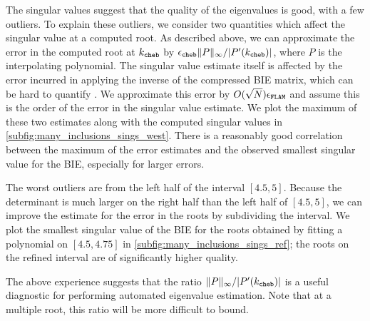 The singular values suggest that the quality of the
eigenvalues is good, with a few outliers.
%
To explain these outliers, we consider two quantities
which affect the singular value at a computed root.
%
As described above, we can approximate the
error in the computed root at $k_{\texttt{cheb}}$ by
${\epsilon_{\texttt{cheb}}} \|P\|_\infty/|P'(k_{\texttt{cheb}})|$,
where $P$ is the interpolating polynomial.
%
The singular value estimate itself is affected by
the error incurred in applying the inverse of the
compressed BIE matrix, which can be hard to quantify
\cite{ho2012fast}.
%
We approximate this error by $O(\sqrt{N}){\epsilon_{\texttt{FLAM}}}$
and assume this is the order of the error in
the singular value estimate.
We plot the maximum of these two estimates
along with the computed singular values in
\cref{subfig:many_inclusions_sings_west}.
There is a reasonably good correlation between
the maximum of the error estimates and the
observed smallest singular value for the BIE,
especially for larger errors.

The worst outliers are from the left half
of the interval $[4.5,5]$.
%
Because the determinant is much larger on the
right half than the left half of $[4.5,5]$,
we can improve the estimate for the error
in the roots by subdividing the interval. 
We plot the smallest singular value of the
BIE for the roots obtained by fitting a polynomial
on $[4.5,4.75]$ in \cref{subfig:many_inclusions_sings_ref};
the roots on the refined interval
are of significantly higher quality.

\begin{remark}
  The above experience suggests that
  the ratio $\|P\|_\infty/|P'(k_{\texttt{cheb}})|$
  is a useful diagnostic for performing
  automated eigenvalue estimation.
  Note that at a multiple root, this ratio
  will be more difficult to bound.
\end{remark}
%



%

